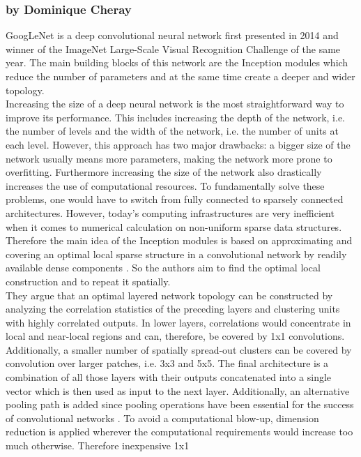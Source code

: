 \documentclass[11pt]{report}
\begin{document}
\subsubsection{by Dominique Cheray}
GoogLeNet is a deep convolutional neural network first presented in 2014 and
winner of the ImageNet Large-Scale Visual Recognition Challenge of the same
year. The main building blocks of this network are the Inception modules which
reduce the number of parameters and at the same time create a deeper and wider
topology. \\
Increasing the size of a deep neural network is the most straightforward way to
improve its performance. This includes increasing the depth of the network, i.e.
the number of levels and the width of the network, i.e. the number of units at
each level. However, this approach has two major drawbacks: a bigger size of the
network usually means more parameters, making the network more prone to
overfitting. Furthermore increasing the size of the network also drastically
increases the use of computational resources. To fundamentally solve these
problems, one would have to switch from fully connected to sparsely connected
architectures. However, today's computing infrastructures are very inefficient
when it comes to numerical calculation on non-uniform sparse data structures.
Therefore the main idea of the Inception modules is based on approximating and covering an
optimal local sparse structure in a convolutional network by readily available dense
components \cite{szegedy2015going}. So the authors aim to find the optimal local
construction and to repeat it spatially. \\
They argue that an optimal layered network topology can be constructed by analyzing the
correlation statistics of the preceding layers and clustering units with highly
correlated outputs. In lower layers, correlations would concentrate in local and
near-local regions and can, therefore, be covered by 1x1 convolutions.
Additionally, a smaller number of spatially spread-out clusters can be covered
by convolution over larger patches, i.e. 3x3 and 5x5. The final architecture is a
combination of all those layers with their outputs concatenated into a single
vector which is then used as input to the next layer. Additionally, an
alternative pooling path is added since pooling operations have been essential
for the success of convolutional networks \cite{szegedy2015going}. To avoid a
computational blow-up, dimension reduction is applied wherever the computational
requirements would increase too much otherwise. Therefore inexpensive 1x1
\end{document}
